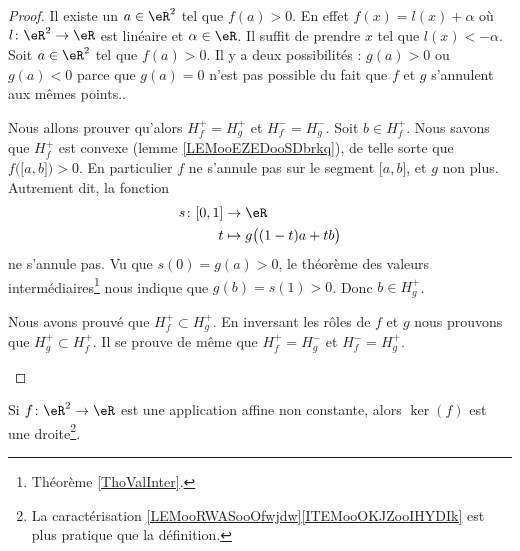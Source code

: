 \begin{proof}
    Il existe un \( a\in \eR^2\) tel que \( f(a)>0\). En effet \( f(x)=l(x)+\alpha\) où \( l\colon \eR^2\to \eR\) est linéaire et \( \alpha\in \eR\). Il suffit de prendre \( x\) tel que \( l(x)<-\alpha\).
    Soit \( a\in \eR^2\) tel que \( f(a)>0\). Il y a deux possibilités : \( g(a)>0\) ou \( g(a)<0\) parce que \( g(a)=0\) n'est pas possible du fait que \( f\) et \( g\) s'annulent aux mêmes points..  

    \begin{subproof}
    \spitem[Si \( g(a)>0\)]
        Nous allons prouver qu'alors \( H^+_f=H^+_g\) et \( H^-_f=H^-_g\). Soit \( b\in H_f^+\). Nous savons que \( H_f^+\) est convexe (lemme \ref{LEMooEZEDooSDbrkq}), de telle sorte que \( f\big( \mathopen[ a , b \mathclose] \big)>0\). En particulier \( f\) ne s'annule pas sur le segment \( \mathopen[ a , b \mathclose]\), et \( g\) non plus. Autrement dit, la fonction
        \begin{equation}
            \begin{aligned}
                s\colon \mathopen[ 0 , 1 \mathclose]&\to \eR \\
                t&\mapsto g\big( (1-t)a+tb \big) 
            \end{aligned}
        \end{equation}
        ne s'annule pas. Vu que \( s(0)=g(a)>0\), le théorème des valeurs intermédiaires\footnote{Théorème \ref{ThoValInter}.} nous indique que \( g(b)= s(1)>0\). Donc \( b\in H_g^+\).

        Nous avons prouvé que \( H_f^+\subset H_g^+\). En inversant les rôles de \( f\) et \( g\) nous prouvons que \( H_g^+\subset H_f^+\).
    \spitem[Si \( g(a)<0\)]
        Il se prouve de même que \( H^+_f=H^-_g\) et \( H^-_f=H^+_g\).
    \end{subproof}
\end{proof}

\begin{proposition}     \label{PROPooSIANooTOKlBI}
    Si \( f\colon \eR^2\to \eR\) est une application affine non constante, alors \( \ker(f)\) est une droite\footnote{La caractérisation \ref{LEMooRWASooOfwjdw}\ref{ITEMooOKJZooIHYDIk} est plus pratique que la définition.}.
\end{proposition}

